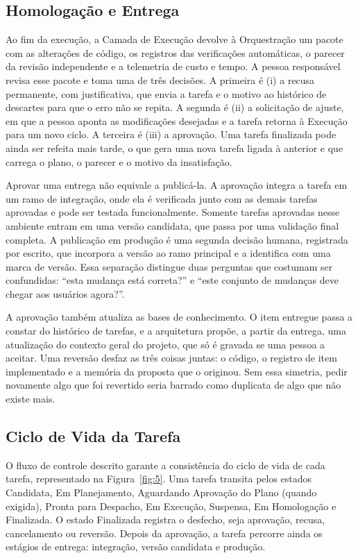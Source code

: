 \subsection{Homologação e Entrega}\label{sec:4.4.4}

Ao fim da execução, a Camada de Execução devolve à Orquestração um pacote com as alterações de código, os registros das verificações automáticas, o parecer da revisão independente e a telemetria de custo e tempo. A pessoa responsável revisa esse pacote e toma uma de três decisões. A primeira é (i) a recusa permanente, com justificativa, que envia a tarefa e o motivo ao histórico de descartes para que o erro não se repita. A segunda é (ii) a solicitação de ajuste, em que a pessoa aponta as modificações desejadas e a tarefa retorna à Execução para um novo ciclo. A terceira é (iii) a aprovação. Uma tarefa finalizada pode ainda ser refeita mais tarde, o que gera uma nova tarefa ligada à anterior e que carrega o plano, o parecer e o motivo da insatisfação.

Aprovar uma entrega não equivale a publicá-la. A aprovação integra a tarefa em um ramo de integração, onde ela é verificada junto com as demais tarefas aprovadas e pode ser testada funcionalmente. Somente tarefas aprovadas nesse ambiente entram em uma versão candidata, que passa por uma validação final completa. A publicação em produção é uma segunda decisão humana, registrada por escrito, que incorpora a versão ao ramo principal e a identifica com uma marca de versão. Essa separação distingue duas perguntas que costumam ser confundidas: ``esta mudança está correta?'' e ``este conjunto de mudanças deve chegar aos usuários agora?''.

A aprovação também atualiza as bases de conhecimento. O item entregue passa a constar do histórico de tarefas, e a arquitetura propõe, a partir da entrega, uma atualização do contexto geral do projeto, que só é gravada se uma pessoa a aceitar. Uma reversão desfaz as três coisas juntas: o código, o registro de item implementado e a memória da proposta que o originou. Sem essa simetria, pedir novamente algo que foi revertido seria barrado como duplicata de algo que não existe mais.

\subsection{Ciclo de Vida da Tarefa}\label{sec:4.4.5}

O fluxo de controle descrito garante a consistência do ciclo de vida de cada tarefa, representado na Figura~\ref{fig:5}. Uma tarefa transita pelos estados Candidata, Em Planejamento, Aguardando Aprovação do Plano (quando exigida), Pronta para Despacho, Em Execução, Suspensa, Em Homologação e Finalizada. O estado Finalizada registra o desfecho, seja aprovação, recusa, cancelamento ou reversão. Depois da aprovação, a tarefa percorre ainda os estágios de entrega: integração, versão candidata e produção.

